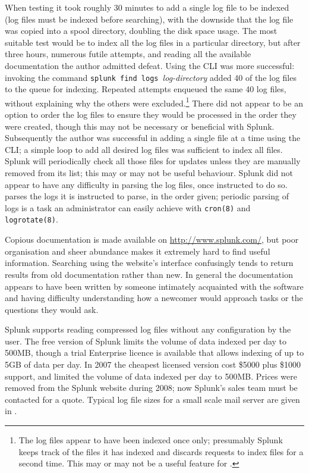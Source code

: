 When testing it took roughly 30 minutes to add a single log file to be
indexed (log files must be indexed before searching), with the downside
that the log file was copied into a spool directory, doubling the disk
space usage.  The most suitable test would be to index all the log files in
a particular directory, but after three hours, numerous futile attempts,
and reading all the available documentation the author admitted defeat.
Using the \gls{CLI} was more successful: invoking the command \newline{}
\tab{} \texttt{splunk find logs }\textit{log-directory\/}\newline{} added
40 of the \numberOFlogFILES{} log files to the queue for indexing.
Repeated attempts enqueued the same 40 log files, without explaining why
the others were excluded.\footnote{The log files appear to have been
indexed once only; presumably Splunk keeps track of the files it has
indexed and discards requests to index files for a second time.  This may
or may not be a useful feature for \parsername{}.} There did not appear to
be an option to order the log files to ensure they would be processed in
the order they were created, though this may not be necessary or beneficial
with Splunk.  Subsequently the author was successful in adding a single
file at a time using the \gls{CLI}; a simple loop to add all desired log
files was sufficient to index all files.  Splunk will periodically check
all those files for updates unless they are manually removed from its list;
this may or may not be useful behaviour.  Splunk did not appear to have any
difficulty in parsing the log files, once instructed to do so.
\parsername{} parses the logs it is instructed to parse, in the order
given; periodic parsing of logs is a task an administrator can easily
achieve with \texttt{cron(8)} and \texttt{logrotate(8)}.

Copious documentation is made available on \url{http://www.splunk.com/},
but poor organisation and sheer abundance makes it extremely hard to find
useful information.  Searching using the website's interface confusingly
tends to return results from old documentation rather than new.  In
general the documentation appears to have been written by someone
intimately acquainted with the software and having difficulty understanding
how a newcomer would approach tasks or the questions they would ask.

Splunk supports reading compressed log files without any configuration by
the user.  The free version of Splunk limits the volume of data indexed per
day to 500MB, though a trial Enterprise licence is available that allows
indexing of up to 5GB of data per day.  In 2007 the cheapest licensed
version cost \$5000 plus \$1000 support, and limited the volume of data
indexed per day to 500MB\@.  Prices were removed from the Splunk website
during 2008; now Splunk's sales team must be contacted for a quote.
Typical log file sizes for a small scale mail server are given in
.

